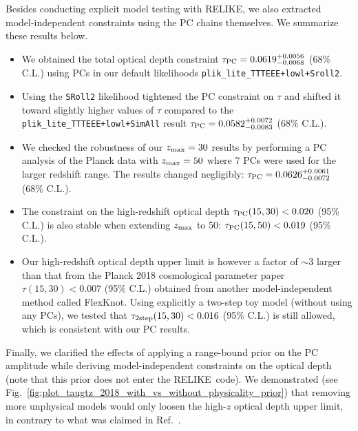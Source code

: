 \documentclass[aps,prd,twocolumn,amsmath,amssymb,showpacs,floatfix,superscriptaddress,nofootinbib]{revtex4-1}
\newcommand{\zmax}{z_{\rm max}}
\newcommand{\relike}{RELIKE}
\begin{document}
{Besides conducting explicit model testing with  \relike, we also extracted model-independent constraints using the PC chains themselves. We summarize these results below.

\begin{itemize}

    \item {We obtained the total optical depth constraint $\tau_{\rm PC} = 0.0619^{+0.0056}_{-0.0068}$ (68\% C.L.) 
    using PCs in our default likelihoods \texttt{plik\_lite\_TTTEEE+lowl+Sroll2}.}
    
    \item {Using the \texttt{SRoll2} likelihood tightened the PC constraint on $\tau$ and shifted it toward slightly higher values of $\tau$ compared to the \texttt{plik\_lite\_TTTEEE+lowl+SimAll} result $\tau_{\rm PC} = 0.0582 ^{+0.0072}_{-0.0083}$ (68\% C.L.).}
    
    \item {We checked the robustness of our $\zmax=30$ results by performing a PC analysis of the Planck data with $\zmax = 50$ where 7 PCs were used for the larger redshift range. The results changed negligibly: $\tau_{\rm PC} = 0.0626 ^{+0.0061}_{-0.0072}$ (68\% C.L.).}
    
    \item{The constraint on the high-redshift optical depth $\tau_{\rm PC}(15, 30) < 0.020$ (95\% C.L.) is also stable when extending $\zmax$ to 50: $\tau_{\rm PC}(15, 50) < 0.019$ (95\% C.L.).}
    
     \item {Our high-redshift optical depth upper limit is however a factor of $\sim3$ larger
     than that from the Planck 2018 cosmological parameter paper $\tau(15, 30) < 0.007$ (95\% C.L.) obtained from another model-independent method called FlexKnot. Using explicitly a two-step toy model (without using any PCs), we tested that $\tau_{\rm 2step}(15, 30) < 0.016$ (95\% C.L.) is still allowed, which is consistent with our PC results.}
     
\end{itemize}

Finally, we clarified the effects of applying a range-bound prior on the PC amplitude while deriving model-independent constraints on the optical depth (note that this prior does not enter the \relike\  code). We demonstrated (see Fig.~\ref{fig:plot_taugtz_2018_with_vs_without_physicality_prior}) that removing more unphysical models would only loosen the high-$z$ optical depth upper limit, in contrary to what was claimed in Ref.~\cite{Millea:2018bko}. \\

}
\end{document}
